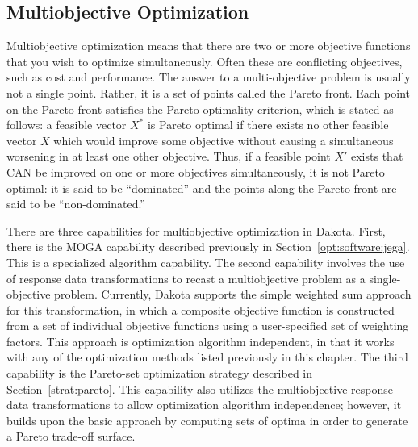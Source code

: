 
\subsection{Multiobjective Optimization}\label{opt:additional:multiobjective}

Multiobjective optimization means that there are two or more objective
functions that you wish to optimize simultaneously.  Often these are
conflicting objectives, such as cost and performance.  The answer to a
multi-objective problem is usually not a single point.  Rather, it is
a set of points called the Pareto front.  Each point on the Pareto
front satisfies the Pareto optimality criterion, which is stated as
follows: a feasible vector $X^{*}$ is Pareto optimal if there
exists no other feasible vector $X$ which would improve some
objective without causing a simultaneous worsening in at least one
other objective.  Thus, if a feasible point $X'$ exists that
CAN be improved on one or more objectives simultaneously, it is not
Pareto optimal: it is said to be ``dominated'' and the points along
the Pareto front are said to be ``non-dominated.''

There are three capabilities for multiobjective optimization in
Dakota.  First, there is the MOGA capability described previously in
Section~\ref{opt:software:jega}.  This is a specialized algorithm
capability.  The second capability involves the use of response data
transformations to recast a multiobjective problem as a
single-objective problem.  Currently, Dakota supports the simple
weighted sum approach for this transformation, in which a composite
objective function is constructed from a set of individual objective
functions using a user-specified set of weighting factors.  This
approach is optimization algorithm independent, in that it works with
any of the optimization methods listed previously in this chapter.
The third capability is the Pareto-set optimization strategy described
in Section~\ref{strat:pareto}.  This capability also utilizes the
multiobjective response data transformations to allow optimization
algorithm independence; however, it builds upon the basic approach by
computing sets of optima in order to generate a Pareto trade-off
surface.

